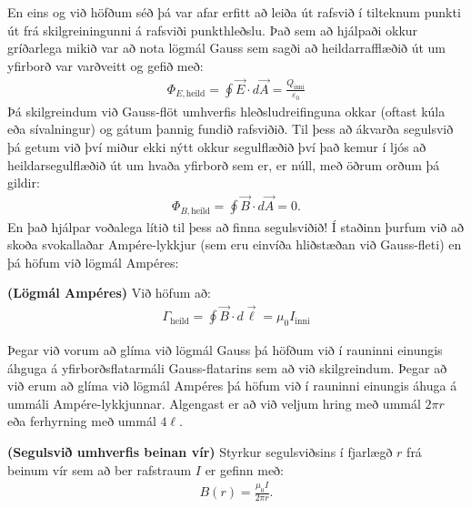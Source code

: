 \ifdefined \wholebook \else\documentclass[oneside]{book}\usepackage{EdlBook}\graphicspath{{figures/}}
\begin{document}
En eins og við höfðum séð þá var afar erfitt að leiða út rafsvið í tilteknum punkti út frá skilgreiningunni á rafsviði punkthleðslu. Það sem að hjálpaði okkur gríðarlega mikið var að nota lögmál Gauss sem sagði að heildarrafflæðið út um yfirborð var varðveitt og gefið með:
\begin{align*}
   \Phi_{E, \text{heild}} =  \oint \vec{E} \cdot d\vec{A} = \frac{Q_{\text{inni}}}{\varepsilon_0}
\end{align*}
Þá skilgreindum við Gauss-flöt umhverfis hleðsludreifinguna okkar (oftast kúla eða sívalningur) og gátum þannig fundið rafsviðið. Til þess að ákvarða segulsvið þá getum við því miður ekki nýtt okkur segulflæðið því það kemur í ljós að heildarsegulflæðið út um hvaða yfirborð sem er, er núll, með öðrum orðum þá gildir:
\begin{align*}
    \Phi_{B, \text{heild}} = \oint \vec{B} \cdot d\vec{A} = 0.
\end{align*}
En það hjálpar voðalega lítið til þess að finna segulsviðið! Í staðinn þurfum við að skoða svokallaðar Ampére-lykkjur (sem eru einvíða hliðstæðan við Gauss-fleti) en þá höfum við lögmál Ampéres:

\begin{tcolorbox}
\begin{theorem}
\textbf{(Lögmál Ampéres)}  Við höfum að:
\begin{align*}
    \Gamma_{\text{heild}} = \oint \vec{B} \cdot d\vec{\ell} = \mu_0 I_{\text{inni}}
\end{align*}
\end{theorem}
\end{tcolorbox}

Þegar við vorum að glíma við lögmál Gauss þá höfðum við í rauninni einungis áhguga á yfirborðsflatarmáli Gauss-flatarins sem að við skilgreindum. Þegar að við erum að glíma við lögmál Ampéres þá höfum við í rauninni einungis áhuga á ummáli Ampére-lykkjunnar. Algengast er að við veljum hring með ummál $2\pi r$ eða ferhyrning með ummál $4\ell$.

\begin{tcolorbox}
\begin{theorem}
\textbf{(Segulsvið umhverfis beinan vír)} Styrkur segulsviðsins í fjarlægð $r$ frá beinum vír sem að ber rafstraum $I$ er gefinn með:
\begin{align*}
    B(r) = \frac{\mu_0 I}{2\pi r}.
\end{align*}
\end{theorem}
\end{tcolorbox}
\end{document}
